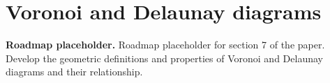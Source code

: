 \chapter{Voronoi and Delaunay diagrams}

\noindent\textbf{Roadmap placeholder.}
Roadmap placeholder for section 7 of the paper. Develop the geometric
definitions and properties of Voronoi and Delaunay diagrams and their
relationship.
